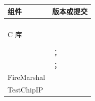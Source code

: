 \par{\small\renewcommand{\arraystretch}{1.15}
\noindent\begin{tabularx}{\linewidth}{@{}P{.27\linewidth}Y@{}}
\toprule
组件 & 版本或提交\\
\midrule
\IntegrationFramework{} & \IntegrationVersion{}\\
\ProcessorCore{} & \texttt{\RocketRevision{}}\\
\VectorUnit{} & \texttt{\SaturnRevision{}}\\
\AcceleratorName{} & \texttt{\GemminiRevision{}}\\
\AcceleratorName{} C 库 & \texttt{\GemminiLibraryRevision{}}\\
\MemoryController{} & \texttt{\LiteDRAMRevision{}}\\
\RealTimeSystem{} & \RealTimeSystemVersion{}\\
\LinuxDistribution{} & \LinuxKernelVersion{}；\texttt{\LinuxRevision{}}\\
\BootFirmware{} & \BootFirmwareVersion{}；\texttt{\OpenSBIRevision{}}\\
FireMarshal & \texttt{\FireMarshalRevision{}}\\
TestChipIP & \texttt{\TestChipIPRevision{}}\\
\bottomrule
\end{tabularx}\par}


